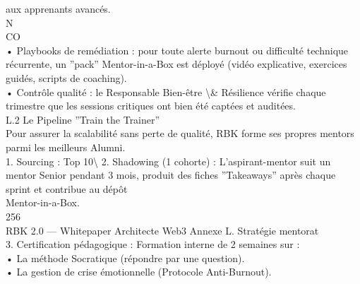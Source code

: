 aux apprenants avancés.\\
\vspace{0.5em}
\vspace{0.5em}
N\\
CO\\
• Playbooks de remédiation : pour toute alerte burnout ou difficulté technique récurrente, un ”pack” Mentor-in-a-Box est déployé (vidéo explicative, exercices\\
guidés, scripts de coaching).\\
\vspace{0.5em}
• Contrôle qualité : le Responsable Bien-être \textbackslash{}& Résilience vérifie chaque trimestre que les sessions critiques ont bien été captées et auditées.\\
\vspace{0.5em}
\vspace{0.5em}
\vspace{0.5em}
L.2 Le Pipeline ”Train the Trainer”\\
Pour assurer la scalabilité sans perte de qualité, RBK forme ses propres mentors parmi les meilleurs Alumni.\\
\vspace{0.5em}
1. Sourcing : Top 10\textbackslash{}%
\vspace{0.5em}
2. Shadowing (1 cohorte) : L’aspirant-mentor suit un mentor Senior pendant 3 mois, produit des fiches ”Takeaways” après chaque sprint et contribue au dépôt\\
Mentor-in-a-Box.\\
\vspace{0.5em}
\vspace{0.5em}
256\\
RBK 2.0 — Whitepaper Architecte Web3                                                                                               Annexe L. Stratégie mentorat\\
\vspace{0.5em}
\vspace{0.5em}
3. Certification pédagogique : Formation interne de 2 semaines sur :\\
\vspace{0.5em}
• La méthode Socratique (répondre par une question).\\
\vspace{0.5em}
• La gestion de crise émotionnelle (Protocole Anti-Burnout).\\
\vspace{0.5em}

